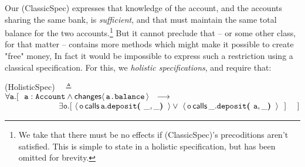 Our (ClassicSpec) expresses that knowledge of the  account, and the accounts sharing the same bank, is \emph{sufficient}, %
and that  %
%
  must maintain the same total balance for the two accounts.\footnote{We take that there must be no effects if (ClassicSpec)'s precoditions aren't satisfied. This is simple to state in a holistic specification, but has been omitted for brevity.}
%
But it cannot preclude that  -- or some other class, for that matter -- contains more methods 
which might make it possible to create "free" money,  In fact it would be impossible to express such a restriction using a classical specification. For this, we  \emph{holistic specifications}, and require that:
 
  \vspace{.01in}
(HolisticSpec)\ \  $\triangleq$\\ 
$\forall \prg{a}.[\ \ \prg{a}:\prg{Account} \wedge \Changes{\prg{a.balance}}  \ \    
    \longrightarrow \ \    \hfill$ \\
  $\strut \hspace{2.3cm} 
  \exists \prg{o}. [\    \Calls{\prg{o}}{\prg{deposit}}{\prg{a}}{\_,\_} \vee\  \Calls{\prg{o}}{\prg{deposit}}{\_}{\prg{a},\_}\  \ ] \ \ \ \ ] \hfill $
\vspace{.05in}



